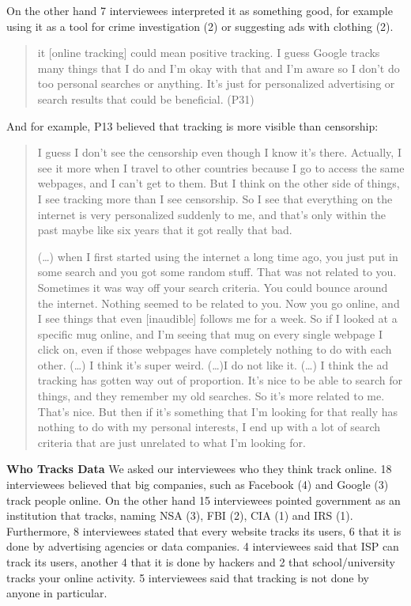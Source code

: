 On the other hand 7 interviewees interpreted it as something good, for example using it as a tool for crime investigation (2) or suggesting ads with clothing (2). 

\begin{quote} it [online tracking] could mean positive tracking. I guess Google tracks many things that I do and I'm okay with that and I'm aware so I don't do too personal searches or anything. It's just for personalized advertising or search results that could be beneficial. (P31) \end{quote}

And for example, P13 believed that tracking is more visible than censorship:

\begin{quote}I guess I don't see the censorship even though I know it's there. Actually, I see it more when I travel to other countries because I go to access the same webpages, and I can't get to them. But I think on the other side of things, I see tracking more than I see censorship. So I see that everything on the internet is very personalized suddenly to me, and that's only within the past maybe like six years that it got really that bad.


(\dots) when I first started using the internet a long time ago, you just put in some search and you got some random stuff. That was not related to you. Sometimes it was way off your search criteria. You could bounce around the internet. Nothing seemed to be related to you. Now you go online, and I see things that even [inaudible] follows me for a week. So if I looked at a specific mug online, and I'm seeing that mug on every single webpage I click on, even if those webpages have completely nothing to do with each other. (\dots) I think it's super weird. (\dots)I do not like it. (\dots) I think the ad tracking has gotten way out of proportion. It's nice to be able to search for things, and they remember my old searches. So it's more related to me. That's nice. But then if it's something that I'm looking for that really has nothing to do with my personal interests, I end up with a lot of search criteria that are just unrelated to what I'm looking for.\end{quote} 



\textbf{Who Tracks Data}
We asked our interviewees who they think track online. 18 interviewees believed that big companies, such as Facebook (4) and Google (3) track people online. On the other hand 15 interviewees pointed government as an institution that tracks, naming NSA (3), FBI (2), CIA (1) and IRS (1). Furthermore, 8 interviewees stated that every website tracks its users, 6 that it is done by advertising agencies or data companies. 4 interviewees said that ISP can track its users, another 4 that it is done by hackers and 2 that school/university tracks your online activity. 5 interviewees said that tracking is not done by anyone in particular.


